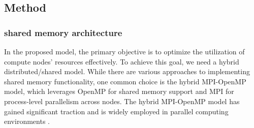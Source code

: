 







\subsection{Method}
\subsubsection{shared memory architecture}
In the proposed model, the primary objective is to optimize the utilization of compute nodes' resources effectively. To achieve this goal, we need a hybrid distributed/shared model. While there are various approaches to implementing shared memory functionality, one common choice is the hybrid MPI-OpenMP model, which leverages OpenMP for shared memory support and MPI for process-level parallelism across nodes. The hybrid MPI-OpenMP model has gained significant traction and is widely employed in parallel computing environments \cite{ouro2019scalability,he2020structured,zhong2020efficient}.

